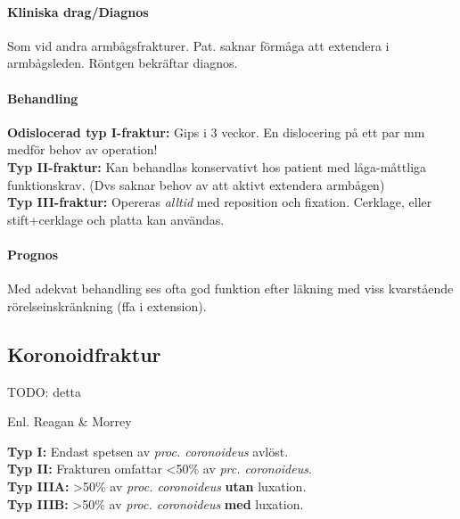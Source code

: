 \documentclass[
  letterpaper,
  DIV=11,
  numbers=noendperiod]{scrreport}
\let\oldparagraph\paragraph
\renewcommand{\paragraph}[1]{\oldparagraph{#1}\mbox{}}
\begin{document}
\hypertarget{kliniska-dragdiagnos-1}{%
\paragraph{Kliniska drag/Diagnos}\label{kliniska-dragdiagnos-1}}

Som vid andra armbågsfrakturer. Pat. saknar förmåga att extendera i
armbågsleden. Röntgen bekräftar diagnos.

\hypertarget{behandling-1}{%
\paragraph{Behandling}\label{behandling-1}}

\textbf{Odislocerad typ I-fraktur:} Gips i 3 veckor. En dislocering på
ett par mm medför behov av operation!\\
\textbf{Typ II-fraktur:} Kan behandlas konservativt hos patient med
låga-måttliga funktionskrav. (Dvs saknar behov av att aktivt extendera
armbågen)\\
\textbf{Typ III-fraktur:} Opereras \emph{alltid} med reposition och
fixation. Cerklage, eller stift+cerklage och platta kan användas.

\hypertarget{prognos-1}{%
\paragraph{Prognos}\label{prognos-1}}

Med adekvat behandling ses ofta god funktion efter läkning med viss
kvarstående rörelseinskränkning (ffa i extension).

\hypertarget{sec-koronoidfraktur}{%
\subsection{Koronoidfraktur}\label{sec-koronoidfraktur}}

TODO: detta

\begin{tcolorbox}[enhanced jigsaw, colback=white, colbacktitle=quarto-callout-tip-color!10!white, toptitle=1mm, arc=.35mm, toprule=.15mm, rightrule=.15mm, titlerule=0mm, breakable, bottomrule=.15mm, colframe=quarto-callout-tip-color-frame, left=2mm, opacityback=0, coltitle=black, title=\textcolor{quarto-callout-tip-color}{\faLightbulb}\hspace{0.5em}{Klassifikation}, leftrule=.75mm, bottomtitle=1mm, opacitybacktitle=0.6]

Enl. Reagan \& Morrey

\textbf{Typ I:} Endast spetsen av \emph{proc. coronoideus} avlöst.\\
\textbf{Typ II:} Frakturen omfattar \textless50\% av \emph{prc.
coronoideus}.\\
\textbf{Typ IIIA:} \textgreater50\% av \emph{proc. coronoideus}
\textbf{utan} luxation.\\
\textbf{Typ IIIB:} \textgreater50\% av \emph{proc. coronoideus}
\textbf{med} luxation.

\end{tcolorbox}
\end{document}
